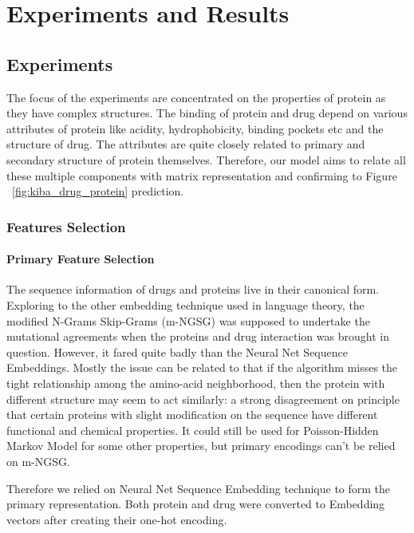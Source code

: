 \chapter{Experiments and Results}


\section{Experiments}

The focus of the experiments are concentrated on the properties of protein as they have complex structures. The binding of protein and drug depend on various attributes of protein like acidity, hydrophobicity, binding pockets etc and the structure of drug. The attributes are quite closely related to primary and secondary structure of protein themselves. Therefore, our model aims to relate all these multiple components with matrix representation and confirming to Figure ~\ref{fig:kiba_drug_protein} prediction.

\subsection{Features Selection}
\subsubsection{Primary Feature Selection}
The sequence information of drugs and proteins live in their canonical form. Exploring to the other embedding technique used in language theory, the modified N-Grams Skip-Grams (m-NGSG) was supposed to undertake the mutational agreements when the proteins and drug interaction was brought in question. However, it fared quite badly than the Neural Net Sequence Embeddings. Mostly the issue can be related to that if the algorithm misses the tight relationship among the amino-acid neighborhood, then the protein with different structure may seem to act similarly: a strong disagreement on principle that certain proteins with slight modification on the sequence have different functional and chemical properties. It could still be used for Poisson-Hidden Markov Model for some other properties, but primary encodings can't be relied on m-NGSG. 

Therefore we relied on Neural Net Sequence Embedding technique to form the primary representation. Both protein and drug were converted to Embedding vectors after creating their one-hot encoding.

